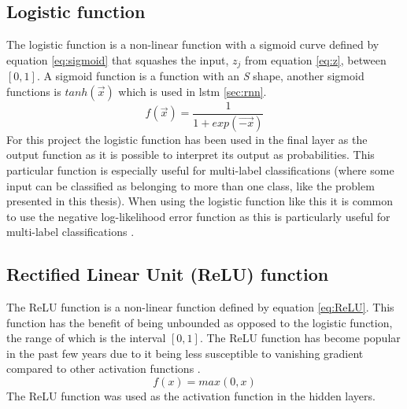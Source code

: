 \subsection{Logistic function}\label{sec:sigmoid_function}
The logistic function is a non-linear function with a sigmoid curve defined by equation \ref{eq:sigmoid} that squashes the input, $z_j$ from equation \ref{eq:z}, between $[0, 1]$. A sigmoid function is a function with an \textit{S} shape, another sigmoid functions is $tanh(\vec{x})$ which is used in lstm \ref{sec:rnn}.
\begin{equation}\label{eq:sigmoid}
    f(\vec{x})=\frac{1}{1+exp(\vec{-x})}
\end{equation}
For this project the logistic function has been used in the final layer as the output function as it is possible to interpret its output as probabilities. This particular function is especially useful for multi-label classifications (where some input can be classified as belonging to more than one class, like the problem presented in this thesis). When using the logistic function like this it is common to use the negative log-likelihood error function as this is particularly useful for multi-label classifications \parencite{bishop1995neural}.

\subsection{Rectified Linear Unit (ReLU) function}\label{sec:relu}
The ReLU function is a non-linear function defined by equation \ref{eq:ReLU}. This function has the benefit of being unbounded as opposed to the logistic function, the range of which is the interval $[0, 1]$. The ReLU function has become popular in the past few years due to it being less susceptible to vanishing gradient compared to other activation functions \parencite{glorot2011deep, lecun2015deep}.
\begin{equation}\label{eq:ReLU}
    f(x) = max(0,x)
\end{equation}
The ReLU function was used as the activation function in the hidden layers.

